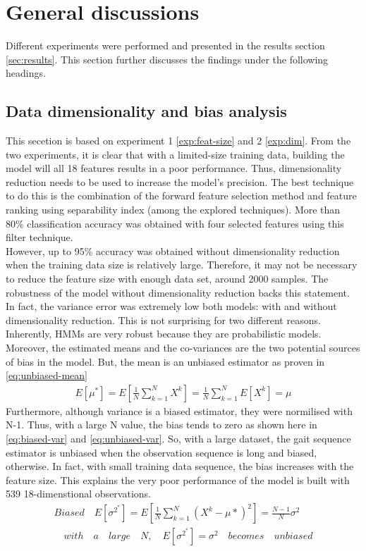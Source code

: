 \chapter{General discussions}

Different experiments were performed and presented in the results section \ref{sec:results}. This section further discusses the findings under the following headings.

\section{Data dimensionality and bias analysis}

This secetion is based on experiment 1 \ref{exp:feat-size} and 2 \ref{exp:dim}.
From the two experiments, it is clear that with a limited-size training data, building the model will all 18 features results in a poor performance. Thus, dimensionality reduction needs to be used to increase the model's precision. The best technique to do this is the combination of the forward feature selection method and feature ranking using separability index (among the explored techniques). More than 80\% classification accuracy was obtained with four selected features using this filter technique.\\
However, up to 95\% accuracy was obtained without dimensionality reduction when the training data size is relatively large. Therefore, it may not be necessary to reduce the feature size with enough data set, around 2000 samples. The robustness of the model without dimensionality reduction backs this statement. In fact, the variance error was extremely low both models: with and without dimensionality reduction. This is not surprising for two different reasons. Inherently, HMMs are very robust because they are probabilistic models. Moreover, the estimated means and the co-variances are the two potential sources of bias in the model. But, the mean is an unbiased estimator as proven in \ref{eq:unbiased-mean} 
\begin{align} 
	E[\mu^*] = E[\frac{1}{N}\sum_{k=1}^{N}X^k] = \frac{1}{N}\sum_{k=1}^{N}E[X^k]=\mu \label{eq:unbiased-mean}
\end{align} 
Furthermore, although variance is a biased estimator, they were normilised with N-1. Thus, with a large N value, the bias tends to zero as shown here in \ref{eq:biased-var} and \ref{eq:unbiased-var}. So, with a large dataset, the gait sequence estimator is unbiased when the observation sequence is long and biased, otherwise. In fact, with small training data sequence, the bias increases with the feature size. This explains the very poor performance of the model is built with 539 18-dimenstional observations.
 \begin{align} 
	Biased \quad	E[\sigma^{2^*}] = E[\frac{1}{N}\sum_{k=1}^{N}(X^k - \mu*)^2] = \frac{N - 1}{N}\sigma^2 \label{eq:biased-var}\\
 \quad with \quad a \quad large \quad N, \quad E[\sigma^{2^*}] = \sigma^2 \label{eq:unbiased-var} \quad becomes \quad unbiased
 \end{align}

